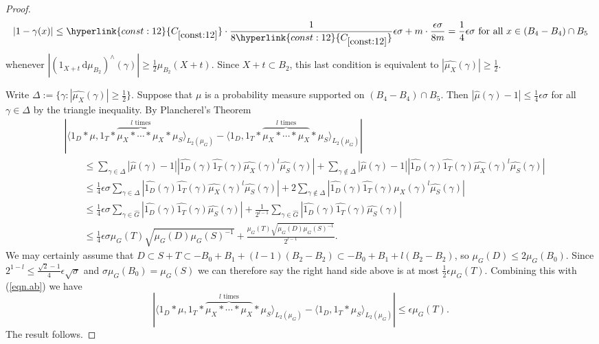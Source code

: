 \documentclass[12pt,reqno]{amsart}
\providecommand{\wh}{\widehat}
\newcommand{\dd}{\,\mathrm{d}}
\numberwithin{equation}{section}
\newcommand{\refconstbig}[1]{%
    \hyperlink{const:#1}{C_{\ref{const:#1}}}%
}
\begin{document}
\begin{proof}
\begin{equation*}
|1-\gamma(x)| \leq \refconstbig{12}\cdot \frac{1}{8\refconstbig{12}}\epsilon \sigma + m \cdot \frac{\epsilon\sigma }{8m}=\frac{1}{4}\epsilon\sigma \text{ for all } x \in (B_4-B_4)\cap B_5
\end{equation*}
whenever $|(1_{X+t}\dd\mu_{B_2})^\wedge(\gamma)| \geq \frac{1}{2}\mu_{B_2}(X+t)$. Since $X+t \subset B_2$, this last condition is equivalent to $|\wh{\mu_X}(\gamma)| \geq \frac{1}{2}$.

Write $\Delta:=\{\gamma:|\wh{\mu_X}(\gamma)| \geq \frac{1}{2}\}$. Suppose that $\mu$ is a probability measure supported on $(B_4-B_4)\cap B_5$. Then $|\wh{\mu}(\gamma)-1| \leq \frac{1}{4}\epsilon \sigma$ for all $\gamma \in \Delta$ by the triangle inequality. By Plancherel's Theorem
\begin{align*}
&\left|\langle 1_{D}\ast \mu , 1_T \ast \overbrace{\mu_X\ast \cdots \ast \mu_X}^{l \text{ times}}\ast \mu_S\rangle_{L_2(\mu_{G})} - \langle 1_{D}, 1_T \ast \overbrace{\mu_X\ast \cdots \ast \mu_X}^{l \text{ times}} \ast \mu_S\rangle_{L_2(\mu_{G})} \right|\\ &\qquad \leq \sum_{\gamma\in \Delta}{|\wh{\mu}(\gamma)-1||\wh{1_D}(\gamma)\wh{1_T}(\gamma)\wh{\mu_X}(\gamma)^l \wh{\mu_S}(\gamma)|}
+\sum_{\gamma \not \in \Delta }{|\wh{\mu}(\gamma)-1||\wh{1_D}(\gamma)\wh{1_T}(\gamma)\wh{\mu_X}(\gamma)^l \wh{\mu_S}(\gamma)|}\\ &\qquad \leq \frac{1}{4}\epsilon \sigma\sum_{\gamma\in \Delta}{|\wh{1_D}(\gamma)\wh{1_T}(\gamma)\wh{\mu_X}(\gamma)^l \wh{\mu_S}(\gamma)|}
+2\sum_{\gamma \not \in \Delta }{|\wh{1_D}(\gamma)\wh{1_T}(\gamma)\wh{\mu_X}(\gamma)^l \wh{\mu_S}(\gamma)|}\\ &\qquad \leq  \frac{1}{4}\epsilon \sigma\sum_{\gamma\in \wh{G}}{|\wh{1_D}(\gamma)\wh{1_T}(\gamma) \wh{\mu_S}(\gamma)|}+\frac{1}{2^{l-1}}\sum_{\gamma \in \wh{G} }{|\wh{1_D}(\gamma)\wh{1_T}(\gamma)\wh{\mu_S}(\gamma)|}\\ &\qquad\leq \frac{1}{4}\epsilon \sigma \mu_G(T)\sqrt{\mu_G(D)\mu_G(S)^{-1}} +  \frac{\mu_G(T)\sqrt{\mu_G(D)\mu_G(S)^{-1}}}{2^{l-1}}.
\end{align*}
We may certainly assume that $D \subset S+T \subset -{B_0}+B_1+(l-1)(B_2-B_2)\subset -B_0+B_1+l(B_2-B_2)$, so $\mu_G(D) \leq 2\mu_G({B_0})$. Since $2^{1-l} \leq \frac{\sqrt{2}-1}{4} \epsilon \sqrt{\sigma}$ and $\sigma \mu_G(B_0)=\mu_G(S)$ we can therefore say the right hand side above is at most $\frac{1}{2}\epsilon \mu_G(T)$. Combining this with (\ref{eqn.ab}) we have
\begin{equation*}
\left|\langle 1_{D}\ast \mu, 1_T \ast \overbrace{\mu_X\ast \cdots \ast \mu_X}^{l \text{ times}}\ast \mu_S\rangle_{L_2(\mu_G)} - \langle 1_D, 1_T \ast \mu_S\rangle_{L_2(\mu_G)}\right| \leq \epsilon \mu_G(T).
\end{equation*}
The result follows.
\end{proof}
\end{document}

